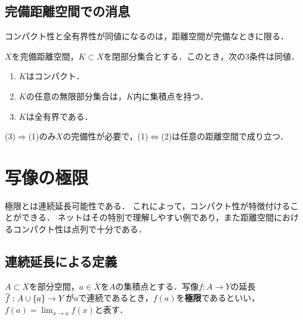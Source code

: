 \documentclass[uplatex,dvipdfmx]{jsreport}
\begin{document}
\subsection{完備距離空間での消息}

\begin{tcolorbox}[colframe=ForestGreen, colback=ForestGreen!10!white,breakable,colbacktitle=ForestGreen!40!white,coltitle=black,fonttitle=\bfseries\sffamily,
title=]
    コンパクト性と全有界性が同値になるのは，距離空間が完備なときに限る．
\end{tcolorbox}

\begin{theorem}
    $X$を完備距離空間，$K\subset X$を閉部分集合とする．このとき，次の3条件は同値．
    \begin{enumerate}
        \item $K$はコンパクト．
        \item $K$の任意の無限部分集合は，$K$内に集積点を持つ．
        \item $K$は全有界である．
    \end{enumerate}
    (3)$\Rightarrow$(1)のみ$X$の完備性が必要で，(1)$\Leftrightarrow$(2)は任意の距離空間で成り立つ．
\end{theorem}

\section{写像の極限}

\begin{tcolorbox}[colframe=ForestGreen, colback=ForestGreen!10!white,breakable,colbacktitle=ForestGreen!40!white,coltitle=black,fonttitle=\bfseries\sffamily,
title=]
    極限とは連続延長可能性である．
    これによって，コンパクト性が特徴付けることができる．
    ネットはその特別で理解しやすい例であり，また距離空間におけるコンパクト性は点列で十分である．
\end{tcolorbox}

\subsection{連続延長による定義}

\begin{definition}
    $A\subset X$を部分空間，$a\in X$を$A$の集積点とする．写像$f:A\to Y$の延長$\overline{f}:A\cup\{a\}\to Y$が$a$で連続であるとき，$f(a)$を\textbf{極限}であるといい，$f(a)=\lim_{x\to a}f(x)$と表す．
\end{definition}
\end{document}
